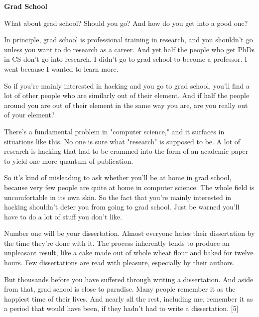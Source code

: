 \textbf{Grad School}

What about grad school? Should you go? And how
                    do you get into a good one?

In principle, grad
                    school is professional training in research, and you
                    shouldn't go unless you want to do research as a career. And
                    yet half the people who get PhDs in CS don't go into
                    research. I didn't go to grad school to become a professor.
                    I went because I wanted to learn more.

So if
                    you're mainly interested in hacking and you go to grad
                    school, you'll find a lot of other people who are similarly
                    out of their element. And if half the people around you are
                    out of their element in the same way you are, are you really
                    out of your element?

There's a fundamental
                    problem in "computer science," and it surfaces in situations
                    like this. No one is sure what "research" is supposed to be.
                    A lot of research is hacking that had to be crammed into the
                    form of an academic paper to yield one more quantum of
                    publication.

So it's kind of misleading to ask
                    whether you'll be at home in grad school, because very few
                    people are quite at home in computer science. The whole
                    field is uncomfortable in its own skin. So the fact that
                    you're mainly interested in hacking shouldn't deter you from
                    going to grad school. Just be warned you'll have to do a lot
                    of stuff you don't like.

Number one will be your
                    dissertation. Almost everyone hates their dissertation by
                    the time they're done with it. The process inherently tends
                    to produce an unpleasant result, like a cake made out of
                    whole wheat flour and baked for twelve hours. Few
                    dissertations are read with pleasure, especially by their
                    authors.

But thousands before you have suffered
                    through writing a dissertation. And aside from that, grad
                    school is close to paradise. Many people remember it as the
                    happiest time of their lives. And nearly all the rest,
                    including me, remember it as a period that would have been,
                    if they hadn't had to write a dissertation. [5]

